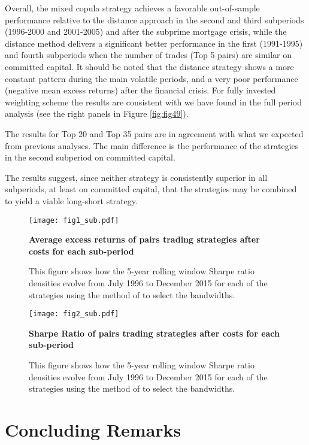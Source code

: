 \documentclass[a4paper]{article}
\begin{document}
Overall, the mixed copula strategy achieves a favorable out-of-sample performance relative to the distance approach in the second and third subperiods (1996-2000 and 2001-2005) and after the subprime mortgage crisis, while the distance method delivers a significant better performance in the first (1991-1995) and fourth subperiods when the number of trades (Top 5 pairs) are similar on committed capital. It should be noted that the distance strategy shows a more constant pattern during the main volatile periods, and a very poor performance (negative mean excess returns) after the financial crisis. For fully invested weighting scheme the results are consistent with we have found in the full period analysis (see the right panels in Figure \ref{fig:fig49}).

The results for Top 20 and Top 35 pairs are in agreement with what we expected from previous analyses. The main difference is the performance of the strategies in the second subperiod on committed capital.

The results suggest, since neither strategy is consistently superior in all subperiods, at least on committed capital, that the strategies may be combined to yield a viable long-short strategy.

\begin{figure}[H]
	\centering
	\texttt{[image: fig1\_sub.pdf]}
	\caption{\textbf{Average excess returns of pairs trading strategies after costs for each sub-period}}
	\caption*{\scriptsize This figure shows how the 5-year rolling window Sharpe ratio densities evolve from July 1996 to December 2015 for each of the strategies using the method of \citet*{sj1991} to select the bandwidths.}
	\label{fig:fig6}
\end{figure}

\begin{figure}[H]
	\centering
	\texttt{[image: fig2\_sub.pdf]}
	\caption{\textbf{Sharpe Ratio of pairs trading strategies after costs for each sub-period}}
	\caption*{\scriptsize This figure shows how the 5-year rolling window Sharpe ratio densities evolve from July 1996 to December 2015 for each of the strategies using the method of \citet*{sj1991} to select the bandwidths.}
	\label{fig:fig7}
\end{figure}

\vspace{1.0cm}


	\section{Concluding Remarks}
	
\end{document}
